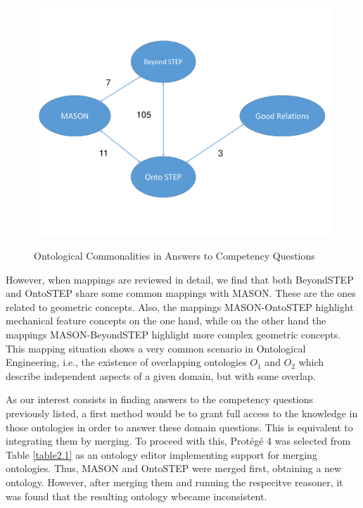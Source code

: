 \begin{figure}
	\begin{center}
		\includegraphics[scale=0.5]{figure-chapterIV/fig4-9}\\
		\caption{Ontological Commonalities in Answers to Competency Questions}
		\label{figure4-9}
	\end{center}
\end{figure}



However, when mappings are reviewed in detail, we find that both BeyondSTEP and OntoSTEP share some common mappings with MASON. These are the ones related to geometric concepts. Also, the mappings MASON-OntoSTEP highlight mechanical feature concepts on the one hand, while on the other hand the mappings   MASON-BeyondSTEP highlight more complex geometric concepts. This mapping situation shows a very common scenario in Ontological Engineering, i.e., the existence of    overlapping ontologies $O_{1}$ and $O_{2}$ which describe independent aspects of a given domain, but with some overlap. 

As our interest consists in finding answers to the competency questions previously listed, a first method would be to grant full access to the knowledge in those ontologies in order to answer these domain questions. This is equivalent to integrating them by merging. To proceed with this, Protégé 4 was selected from Table \ref{table2.1} as an ontology editor implementing support for merging ontologies. Thus, MASON and OntoSTEP were merged first, obtaining a new ontology. However, after merging them and running the respecitve reasoner, it was found that the resulting ontology wbecame inconsistent.


